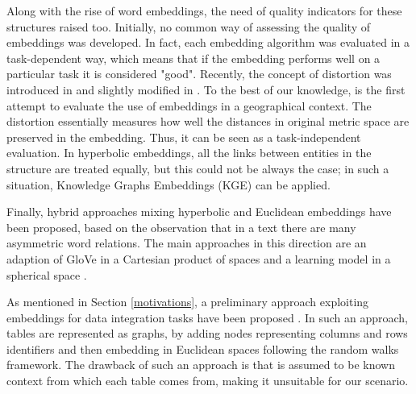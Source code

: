 Along with the rise of word embeddings, the need of quality indicators for these structures raised too. 
Initially, no common way of assessing the quality of embeddings was developed. 
In fact, each embedding algorithm was evaluated in a task-dependent way, which means that if the embedding performs well on a particular task it is considered "good". 
Recently, the concept of distortion was introduced in \cite{sala2018representation} and slightly modified in \cite{dassereto2019evaluating}. 
To the best of our knowledge, \cite{dassereto2019evaluating} is the first attempt to evaluate the use of embeddings in a geographical context. 
The distortion essentially measures how well the distances in original metric space are preserved in the embedding. Thus, it can be seen as a task-independent evaluation. In hyperbolic embeddings, all the links between entities in the structure are treated equally, but this could not be always the case; in such a situation, Knowledge Graphs Embeddings (KGE) can be applied. 

Finally, hybrid approaches mixing hyperbolic and Euclidean embeddings have been proposed, based on the observation that in a text there are many asymmetric word relations. The main approaches in this direction are an adaption of GloVe in a Cartesian product of spaces \cite{tifrea2018poincare} and a learning model in a spherical space \cite{meng2019spherical}.  

As mentioned in Section \ref{motivations}, a preliminary approach exploiting embeddings for data integration tasks have been proposed \cite{cappuzzo2020creating}. In such an approach, tables are represented as graphs, by adding nodes representing columns and rows identifiers and then embedding in Euclidean spaces following the random walks framework. The drawback of such an approach is that is assumed to be known context from which each table comes from, making it unsuitable for our scenario.


